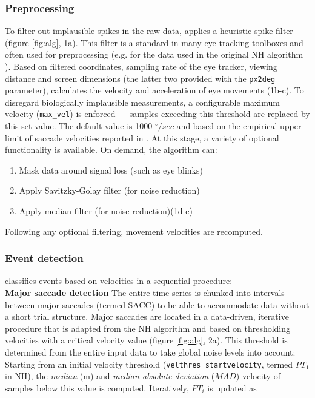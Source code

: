 \subsubsection*{Preprocessing}

 To filter out implausible spikes in the raw data, \remodnav applies a heuristic spike filter \citep{stampe1993} (figure \ref{fig:alg}, 1a). This filter is a standard in many eye tracking toolboxes and often used for preprocessing (e.g. for the data used in the original NH algorithm \citep{Friedman2018}). Based on filtered coordinates, sampling rate of the eye tracker, viewing distance and screen dimensions (the latter two provided with the \texttt{px2deg} parameter), \remodnav calculates the velocity and acceleration of eye movements (1b-c). To disregard biologically implausible measurements, a configurable maximum velocity (\texttt{max\_vel}) is enforced --- samples exceeding this threshold are replaced by this set value. The default value is 1000 $^\circ/sec$ and based on the empirical upper limit of saccade velocities reported in \cite{holmqvist2011eye}.
 At this stage, a variety of optional functionality is available. On demand, the algorithm can: 
 \begin{enumerate}
	\item Mask data around signal loss (such as eye blinks)
	\item Apply Savitzky-Golay filter (for noise reduction)
	\item Apply median filter (for noise reduction)(1d-e)
 \end{enumerate}
Following any optional filtering, movement velocities are recomputed.\\

\subsubsection*{Event detection}
\remodnav classifies events based on velocities in a sequential procedure: \\
 \textbf{Major saccade detection} The entire time series is chunked into intervals between major saccades (termed SACC) to be able to accommodate data without a short trial structure. Major saccades are located in a data-driven, iterative procedure that is adapted from the NH algorithm and based on thresholding velocities with a critical velocity value (figure \ref{fig:alg}, 2a). This threshold is determined from the entire input data to take global noise levels into account: Starting from an initial velocity threshold (\texttt{velthres\_startvelocity}, termed $PT_1$ in NH), the \textit{median} (m) and \textit{median absolute deviation} ($MAD$) velocity of samples below this value is computed. Iteratively, $PT_i$ is updated as
 
